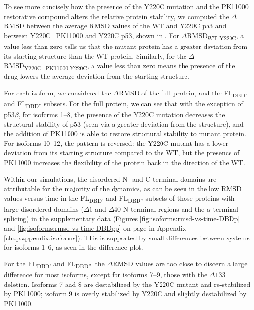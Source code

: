 To see more concisely how the presence of the Y220C mutation and the PK11000 restorative compound alters the relative protein stability, we computed the \(\Delta\)RMSD between the average RMSD values of the WT and Y220C p53 and between Y220C\_PK11000 and Y220C p53, shown in . For \(\Delta\)RMSD\textsubscript{WT \textminus{} Y220C}, a value less than zero tells us that the mutant protein has a greater deviation from its starting structure than the WT protein. Similarly, for the \(\Delta\)RMSD\textsubscript{Y220C\_PK11000 \textminus{} Y220C}, a value less than zero means the presence of the drug lowers the average deviation from the starting structure.

For each isoform, we considered the \(\Delta\)RMSD of the full protein, and the FL\textbar\textsubscript{DBD'} and FL\textbar\textsubscript{DBD''} subsets. For the full protein, we can see that with the exception of p53\(\beta\), for isoforms \numrange{1}{8}, the presence of the Y220C mutation decreases the structural stability of p53 (seen via a greater deviation from the structure), and the addition of PK11000 is able to restore structural stability to mutant protein. For isoforms \numrange{10}{12}, the pattern is reversed: the Y220C mutant has a lower deviation from its starting structure compared to the WT, but the presence of PK11000 increases the flexibility of the protein back in the direction of the WT. 

Within our simulations, the disordered N- and C-terminal domains are attributable for the majority of the dynamics, as can be seen in the low RMSD values versus time in the FL\textbar\textsubscript{DBD'} and FL\textbar\textsubscript{DBD''} subsets of those proteins with large disordered domains (\(\Delta0\) and \(\Delta40\) N-terminal regions and the \(\alpha\) terminal splicing) in the supplementary data (Figures \ref{fig:isoforms:rmsd-vs-time-DBDp} and \ref{fig:isoforms:rmsd-vs-time-DBDpp} on page \pageref{fig:isoforms:rmsd-vs-time-DBDp} in Appendix \ref{chap:appendix:isoforms}). This is supported by small differences between systems for isoforms \numrange{1}{6}, as seen in the difference plot.

For the FL\textbar\textsubscript{DBD'} and FL\textbar\textsubscript{DBD''}, the \(\Delta\)RMSD values are too close to discern a large difference for most isoforms, except for isoforms \numrange{7}{9}, those with the \(\Delta133\) deletion. Isoforms \num{7} and \num{8} are destabilized by the Y220C mutant and re-stabilized by PK11000; isoform \num{9} is overly stabilized by Y220C and slightly destabilized by PK11000.


